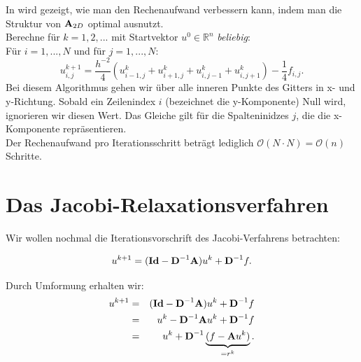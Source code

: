 In \cite{ALO2} wird gezeigt, wie man den Rechenaufwand verbessern kann, indem man die Struktur von ${\textbf{A}}_{2D}$ optimal ausnutzt.\\
Berechne für $k = 1,2,...$ mit Startvektor $u^{0} \in \mathbb{R}^{n}$ \textit{beliebig}:\\
Für $i = 1,...,N$ und für $j = 1,...,N$:
\begin{equation}
u^{k+1}_{i,j} = \frac{h^{-2}}{4} (u^{k}_{i-1,j} + u^{k}_{i+1,j} + u^{k}_{i,j-1} + u^{k}_{i,j+1}) - \frac{1}{4} f_{i,j}.
\end{equation}
Bei diesem Algorithmus gehen wir über alle inneren Punkte des Gitters in x- und y-Richtung. Sobald ein Zeilenindex $i$ (bezeichnet die y-Komponente) Null wird, ignorieren wir diesen Wert. Das Gleiche gilt für die Spalteninidzes $j$, die die x-Komponente repräsentieren.\\
Der Rechenaufwand pro Iterationsschritt beträgt lediglich $\mathcal{O}(N \cdot N)=\mathcal{O}(n)$ Schritte.

\section{Das Jacobi-Relaxationsverfahren}\label{s.Jacobi Relaxation}

Wir wollen nochmal die Iterationsvorschrift des Jacobi-Verfahrens betrachten:

\begin{equation}
u^{k+1} = ({\textbf{Id}} - {\textbf{D}}^{-1}{\textbf{A}})u^{k} + {\textbf{D}}^{-1}f.
\end{equation}

Durch Umformung erhalten wir:
\begin{eqnarray}
u^{k+1} &=& ({\textbf{Id}} - {\textbf{D}}^{-1}{\textbf{A}})u^{k} + {\textbf{D}}^{-1}f \notag \\
&=& u^{k} - {\textbf{D}}^{-1}{\textbf{A}}u^{k} + {\textbf{D}}^{-1}f \notag \\
&=& u^{k} + {\textbf{D}}^{-1} \underbrace{(f - {\textbf{A}}u^{k})}_{= r^{k}}.
\end{eqnarray}

